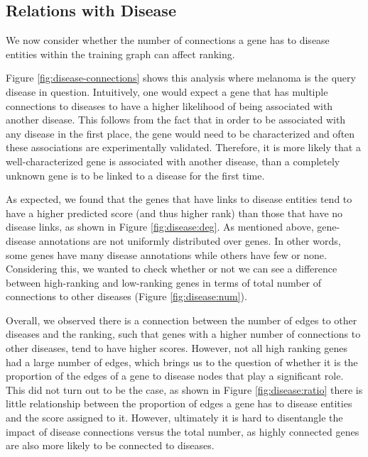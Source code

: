 \subsection{Relations with Disease}
\label{ssec:rel-disease}

We now consider whether the number of connections a gene has to disease entities within the training graph can affect ranking.

Figure \ref{fig:disease-connections} shows this analysis where melanoma is the query disease in question. Intuitively, one would expect a gene that has multiple connections to diseases to have a higher likelihood of being associated with another disease. This follows from the fact that in order to be associated with any disease in the first place, the gene would need to be characterized and often these associations are experimentally validated. Therefore, it is more likely that a well-characterized gene is associated with another disease, than a completely unknown gene is to be linked to a disease for the first time.

As expected, we found that the genes that have links to disease entities tend to have a higher predicted score (and thus higher rank) than those that have no disease links, as shown in Figure \ref{fig:disease:deg}. As mentioned above, gene-disease annotations are not uniformly distributed over genes. In other words, some genes have many disease annotations while others have few or none. Considering this, we wanted to check whether or not we can see a difference between high-ranking and low-ranking genes in terms of total number of connections to other diseases (Figure \ref{fig:disease:num}).

Overall, we observed there is a connection between the number of edges to other diseases and the ranking, such that genes with a higher number of connections to other diseases, tend to have higher scores. However, not all high ranking genes had a large number of edges, which brings us to the question of whether it is the proportion of the edges of a gene to disease nodes that play a significant role. This did not turn out to be the case, as shown in Figure \ref{fig:disease:ratio} there is little relationship between the proportion of edges a gene has to disease entities and the score assigned to it. However, ultimately it is hard to disentangle the impact of disease connections versus the total number, as highly connected genes are also more likely to be connected to diseases.

